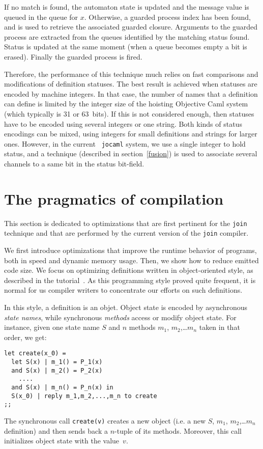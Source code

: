 If no match is found, the automaton state is updated and the message
value is queued in the queue for $x$.  Otherwise, a guarded process
index has been found, and is used to retrieve the associated guarded
closure.  Arguments to the guarded process are extracted from the
queues identified by the matching status found.  Status is updated at
the same moment (when a queue becomes empty a bit is erased).  Finally
the guarded process is fired.

Therefore, the performance of this technique much relies on fast
comparisons and modifications of definition statuses.  The best result
is achieved when statuses are encoded by machine integers.  In that
case, the number of names that a definition can define is limited by
the integer size of the hoisting Objective Caml system (which
typically is 31 or 63~bits).  If this is not considered enough, then
statuses have to be encoded using several integers or one string. Both
kinds of status encodings can be mixed, using integers for small
definitions and strings for larger ones. However, in the current {\tt
  jocaml} system, we use a single integer to hold status, and a
technique (described in section~\ref{fusion}) is used to associate
several channels to a same bit in the status bit-field.

\section{The pragmatics of compilation}\label{opt}
\label{optimization}

This section is dedicated to optimizations that are first pertinent
for the {\tt join} technique and that  are performed by the
current version of the {\tt join} compiler.

We first introduce optimizations that improve the runtime behavior of
programs, both in speed and dynamic memory usage. Then, we show how to
reduce emitted code size.
We focus on optimizing definitions written in
object-oriented style, as described in the tutorial~\cite{Join}. As
this programming style proved quite frequent,
it is normal for us compiler writers to concentrate
our efforts on such definitions.

In this style, a definition is an objet. Object state is encoded by
asynchronous {\em state names}, while synchronous {\em methods} access
or modify object state.
For instance, given one state name $S$ and $n$ methods
$m_1$, $m_2$,\ldots $m_n$ taken in that order, we get:
\begin{verbatim}
let create(x_0) =
  let S(x) | m_1() = P_1(x)
  and S(x) | m_2() = P_2(x)
    ....
  and S(x) | m_n() = P_n(x) in
  S(x_0) | reply m_1,m_2,...,m_n to create
;;
\end{verbatim}
\noindent The synchronous call \verb+create(v)+ creates a new
object (i.e. a new $S$, $m_1$, $m_2$,\ldots $m_n$ definition)
and then sends back a $n$-tuple of its methods. Moreover, this call
initializes object state with the value~$v$.


